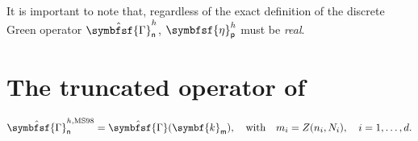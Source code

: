 \documentclass[draft, appendixprefix=true, chapterprefix=true, fontsize=12pt, numbers=noendperiod]{scrbook}
\newcommand{\tens}[1]{\symbfsf{#1}}
\renewcommand{\vec}[1]{\symbf{#1}}
\newcommand{\tuple}[1]{\mathsf{#1}}
\begin{document}
It is important to note that, regardless of the exact definition of the discrete Green operator \(\hat{\tens\Gamma}_{\tuple{n}}^h\),  \(\tens\eta_{\tuple{p}}^h\) must be \emph{real}.



\section{The truncated operator of \textcite{moul1998}}

\begin{equation}
  \hat{\tens\Gamma}_{\tuple{n}}^{h, \mathrm{MS98}}=\hat{\tens\Gamma}(\vec k_{\tuple{m}}),\quad\text{with}\quad
  m_i=Z(n_i, N_i),\quad i=1,\ldots, d.
\end{equation}


\printbibliography
\end{document}
